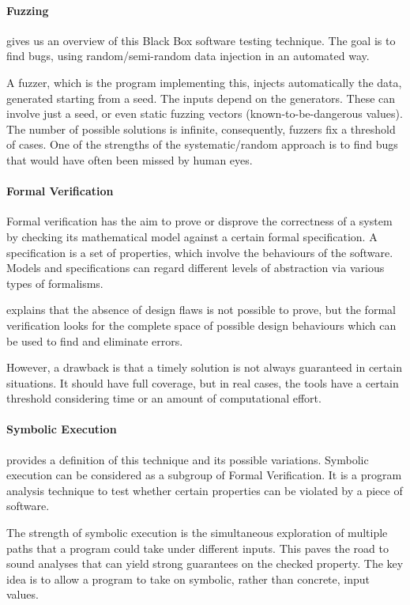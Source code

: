 \paragraph{Fuzzing} \citet{OWASPFuzz} gives us an overview of this Black Box software testing technique. 
The goal is to find bugs, using random/semi-random data injection in an automated way. 

A fuzzer, which is the program implementing this, injects automatically the data, generated starting from a seed. The inputs depend on the generators. 
These can involve just a seed, or even static fuzzing vectors (known-to-be-dangerous values).
The number of possible solutions is infinite, consequently, fuzzers fix a threshold of cases.
One of the strengths of the systematic/random approach is to find bugs that would have often been missed by human eyes.

\paragraph{Formal Verification} Formal verification has the aim to prove or disprove the correctness of a system by checking its mathematical model
against a certain formal specification. A specification is a set of properties, which involve the
behaviours of the software. Models and specifications can regard different levels of abstraction via various types of formalisms.

\cite{FormalVerificationDef} explains that the absence of design flaws is not possible to prove, but the formal verification looks 
for the complete space of possible design behaviours which can be used to find and eliminate errors.

However, a drawback is that a timely solution is not always guaranteed in certain situations. It should have full coverage, but 
in real cases, the tools have a certain threshold considering time or an amount of computational effort.


\paragraph{Symbolic Execution} \citet{SymbolicExecution} provides a definition of this technique and its possible variations. 
Symbolic execution can be considered as a subgroup of Formal Verification. 
It is a program analysis technique to test
whether certain properties can be violated by a piece of software. 

The strength of symbolic execution is the simultaneous exploration of multiple paths
that a program could take under different inputs. This paves the road to sound analyses that can yield strong guarantees on the checked property. 
The key idea is to allow a program to take on
symbolic, rather than concrete, input values. 

